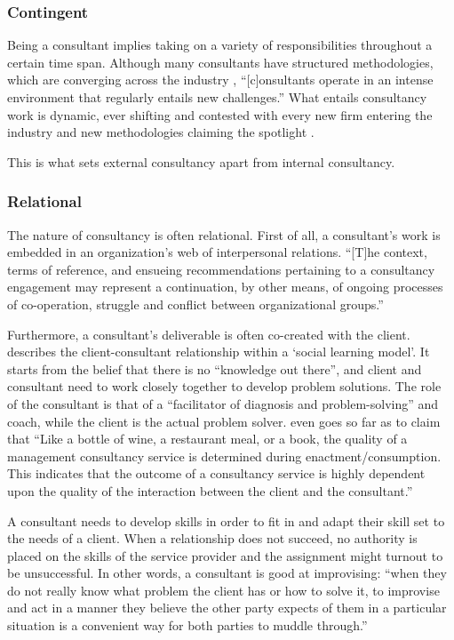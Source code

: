 \documentclass[12pt]{article}
\begin{document}
\subsubsection{Contingent}\label{contingent}

Being a consultant implies taking on a variety of responsibilities
throughout a certain time span. Although many consultants have
structured methodologies, which are converging across the industry
\citep[ 17]{werr1986}, ``{[}c{]}onsultants operate in an intense
environment that regularly entails new challenges.'' \citep[
138]{chowdhury2021} What entails consultancy work is dynamic, ever
shifting and contested with every new firm entering the industry and new
methodologies claiming the spotlight \citep[ 24]{kipping2012}.

This is what sets external consultancy apart from internal consultancy.

\subsubsection{Relational}\label{relational}

The nature of consultancy is often relational. First of all, a
consultant's work is embedded in an organization's web of interpersonal
relations. ``{[}T{]}he context, terms of reference, and ensueing
recommendations pertaining to a consultancy engagement may represent a
continuation, by other means, of ongoing processes of co-operation,
struggle and conflict between organizational groups.''
\citep{bloomfield1995}

Furthermore, a consultant's deliverable is often co-created with the
client. \citet[290-297]{nikolova2009} describes the client-consultant
relationship within a `social learning model'. It starts from the belief
that there is no ``knowledge out there'', and client and consultant need
to work closely together to develop problem solutions. The role of the
consultant is that of a ``facilitator of diagnosis and problem-solving''
and coach, while the client is the actual problem solver.
\citet[22]{clark1998} even goes so far as to claim that ``Like a bottle
of wine, a restaurant meal, or a book, the quality of a management
consultancy service is determined during enactment/consumption. This
indicates that the outcome of a consultancy service is highly dependent
upon the quality of the interaction between the client and the
consultant.''

A consultant needs to develop skills in order to fit in and adapt their
skill set to the needs of a client. When a relationship does not
succeed, no authority is placed on the skills of the service provider
\citep[ 10]{furusten2000} and the assignment might turnout to be
unsuccessful. In other words, a consultant is good at improvising:
``when they do not really know what problem the client has or how to
solve it, to improvise and act in a manner they believe the other party
expects of them in a particular situation is a convenient way for both
parties to muddle through.'' \citep[ 270]{furusten2009}
\end{document}

